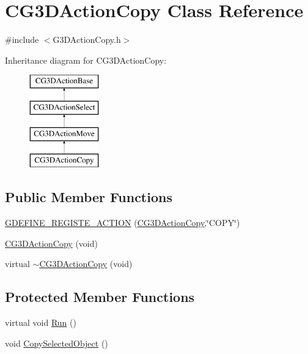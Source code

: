 \hypertarget{class_c_g3_d_action_copy}{}\section{C\+G3\+D\+Action\+Copy Class Reference}
\label{class_c_g3_d_action_copy}


{\ttfamily \#include $<$G3\+D\+Action\+Copy.\+h$>$}

Inheritance diagram for C\+G3\+D\+Action\+Copy\+:\begin{figure}[H]
\begin{center}
\leavevmode
\includegraphics[height=4.000000cm]{class_c_g3_d_action_copy}
\end{center}
\end{figure}
\subsection*{Public Member Functions}
\begin{DoxyCompactItemize}
\item 
\hyperlink{class_c_g3_d_action_copy_ab804b197e855fa3162cd9e0530e8daaf}{G\+D\+E\+F\+I\+N\+E\+\_\+\+R\+E\+G\+I\+S\+T\+E\+\_\+\+A\+C\+T\+I\+O\+N} (\hyperlink{class_c_g3_d_action_copy}{C\+G3\+D\+Action\+Copy},\char`\"{}C\+O\+P\+Y\char`\"{})
\item 
\hyperlink{class_c_g3_d_action_copy_ab6604500fefcd062bf4e3d2811ea8244}{C\+G3\+D\+Action\+Copy} (void)
\item 
virtual \hyperlink{class_c_g3_d_action_copy_a8149726f20df40ca2bff8b570ab43c68}{$\sim$\+C\+G3\+D\+Action\+Copy} (void)
\end{DoxyCompactItemize}
\subsection*{Protected Member Functions}
\begin{DoxyCompactItemize}
\item 
virtual void \hyperlink{class_c_g3_d_action_copy_a6f6fcdefa9134fe9af6db0933b1db95c}{Run} ()
\item 
void \hyperlink{class_c_g3_d_action_copy_a4a76358854f51f119d22169dbbc11a0e}{Copy\+Selected\+Object} ()
\end{DoxyCompactItemize}
